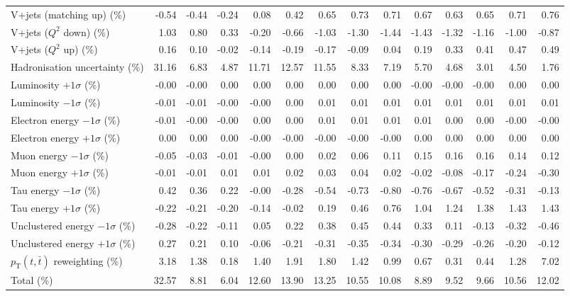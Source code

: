 \begin{table}[htbp]
{\begin{tabular}{lrrrrrrrrrrrrr}
V+jets (matching up) (\%) & -0.54 & -0.44 & -0.24 & 0.08 & 0.42 & 0.65 & 0.73 & 0.71 & 0.67 & 0.63 & 0.65 & 0.71 & 0.76 \\ 
V+jets ($Q^{2}$ down) (\%) & 1.03 & 0.80 & 0.33 & -0.20 & -0.66 & -1.03 & -1.30 & -1.44 & -1.43 & -1.32 & -1.16 & -1.00 & -0.87 \\ 
V+jets ($Q^{2}$ up) (\%) & 0.16 & 0.10 & -0.02 & -0.14 & -0.19 & -0.17 & -0.09 & 0.04 & 0.19 & 0.33 & 0.41 & 0.47 & 0.49 \\ 
Hadronisation uncertainty (\%) & 31.16 & 6.83 & 4.87 & 11.71 & 12.57 & 11.55 & 8.33 & 7.19 & 5.70 & 4.68 & 3.01 & 4.50 & 1.76 \\ 
Luminosity $+1\sigma$ (\%) & -0.00 & -0.00 & 0.00 & 0.00 & 0.00 & 0.00 & 0.00 & 0.00 & -0.00 & -0.00 & -0.00 & 0.00 & 0.00 \\ 
Luminosity $-1\sigma$ (\%) & -0.01 & -0.01 & -0.00 & -0.00 & 0.00 & 0.01 & 0.01 & 0.01 & 0.01 & 0.01 & 0.01 & 0.01 & 0.01 \\ 
Electron energy $-1\sigma$ (\%) & -0.01 & -0.00 & -0.00 & 0.00 & 0.00 & 0.01 & 0.01 & 0.01 & 0.01 & 0.00 & 0.00 & -0.00 & -0.00 \\ 
Electron energy $+1\sigma$ (\%) & 0.00 & 0.00 & 0.00 & -0.00 & -0.00 & -0.00 & -0.00 & -0.00 & 0.00 & 0.00 & 0.00 & 0.00 & 0.00 \\ 
Muon energy $-1\sigma$ (\%) & -0.05 & -0.03 & -0.01 & -0.00 & 0.00 & 0.02 & 0.06 & 0.11 & 0.15 & 0.16 & 0.16 & 0.14 & 0.12 \\ 
Muon energy $+1\sigma$ (\%) & -0.01 & -0.01 & 0.01 & 0.01 & 0.02 & 0.03 & 0.04 & 0.02 & -0.02 & -0.08 & -0.17 & -0.24 & -0.30 \\ 
Tau energy $-1\sigma$ (\%) & 0.42 & 0.36 & 0.22 & -0.00 & -0.28 & -0.54 & -0.73 & -0.80 & -0.76 & -0.67 & -0.52 & -0.31 & -0.13 \\ 
Tau energy $+1\sigma$ (\%) & -0.22 & -0.21 & -0.20 & -0.14 & -0.02 & 0.19 & 0.46 & 0.76 & 1.04 & 1.24 & 1.38 & 1.43 & 1.43 \\ 
Unclustered energy $-1\sigma$ (\%) & -0.28 & -0.22 & -0.11 & 0.05 & 0.22 & 0.38 & 0.45 & 0.44 & 0.33 & 0.11 & -0.13 & -0.32 & -0.46 \\ 
Unclustered energy $+1\sigma$ (\%) & 0.27 & 0.21 & 0.10 & -0.06 & -0.21 & -0.31 & -0.35 & -0.34 & -0.30 & -0.29 & -0.26 & -0.20 & -0.12 \\ 
$p_\mathrm{T}(t,\bar{t})$ reweighting (\%) & 3.18 & 1.38 & 0.18 & 1.40 & 1.91 & 1.80 & 1.42 & 0.99 & 0.67 & 0.31 & 0.44 & 1.28 & 7.02 \\ 
\hline 
Total (\%) & 32.57  & 8.81  & 6.04  & 12.60  & 13.90  & 13.25  & 10.55  & 10.08  & 8.89  & 9.52  & 9.66  & 10.56  & 12.02 \\ 
\hline 
\end{tabular}
}
\end{table}
